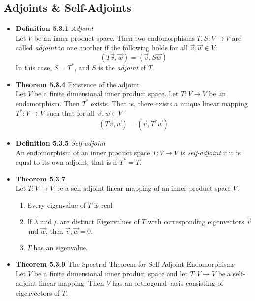 \documentclass[11pt,a4paper]{article}
\begin{document}
\subsection{Adjoints \& Self-Adjoints}

\begin{itemize}

    \item \textbf{Definition 5.3.1} \emph{Adjoint} \\
        Let $V$ be an inner product space.
        Then two endomorphisms $T, S : V \to V$ are called \emph{adjoint} to one another
        if the following holds for all $\vec{v}, \vec{w} \in V$:
        \[
            (T \vec{v}, \vec{w}) = (\vec{v}, S \vec{w})
        \]
        In this case, $S = T^*$, and $S$ is the \emph{adjoint} of $T$.

    \item \textbf{Theorem 5.3.4} Existence of the adjoint \\
        Let $V$ be a finite dimensional inner product space.
        Let $T : V \to V$ be an endomorphism.
        Then $T^*$ exists.
        That is, there exists a unique linear mapping $T^* : V \to V$ such that for all
        $\vec{v}, \vec{w} \in V$
        \[
            (T \vec{v}, \vec{w}) = (\vec{v}, T^* \vec{w})
        \]

    \item \textbf{Definition 5.3.5} \emph{Self-adjoint} \\
        An endomorphism of an inner product space $T : V \to V$ is \emph{self-adjoint}
        if it is equal to its own adjoint, that is if $T^* = T$.

    \item \textbf{Theorem 5.3.7} \\
        Let $T : V \to V$ be a self-adjoint linear mapping of an inner product space $V$.
        \begin{enumerate}
            \item Every eigenvalue of $T$ is real.
            \item If $\lambda$ and $\mu$ are distinct Eigenvalues of $T$ with corresponding
                eigenvectors $\vec{v}$ and $\vec{w}$, then $\vec{v}, \vec{w} = 0$.
            \item $T$ has an eigenvalue.
        \end{enumerate}

    \item \textbf{Theorem 5.3.9} The Spectral Theorem for Self-Adjoint Endomorphisms \\
        Let $V$ be a finite dimensional inner product space and let $T : V \to V$ be a
        self-adjoint linear mapping.
        Then $V$ has an orthogonal basis consisting of eigenvectors of $T$.


\end{itemize}
\end{document}
